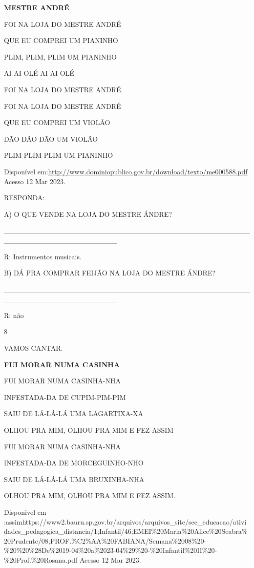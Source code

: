 {{\textbf{MESTRE ANDRÉ}

FOI NA LOJA DO MESTRE ANDRÉ

QUE EU COMPREI UM PIANINHO

PLIM, PLIM, PLIM UM PIANINHO

AI AI OLÉ AI AI OLÉ

FOI NA LOJA DO MESTRE ANDRÉ.

FOI NA LOJA DO MESTRE ANDRÉ

QUE EU COMPREI UM VIOLÃO

DÃO DÃO DÃO UM VIOLÃO

PLIM PLIM PLIM UM PIANINHO

Disponível
em:\url{http://www.dominiopublico.gov.br/download/texto/me000588.pdf}
Acesso 12 Mar 2023.

RESPONDA:

A) O QUE VENDE NA LOJA DO MESTRE ÁNDRE?

\_\_\_\_\_\_\_\_\_\_\_\_\_\_\_\_\_\_\_\_\_\_\_\_\_\_\_\_\_\_\_\_\_\_\_\_\_\_\_\_\_\_\_\_\_\_\_\_\_\_\_\_\_\_\_\_\_\_\_\_\_\_\_\_\_\_\_\_\_\_

R: Instrumentos musicais.

B) DÁ PRA COMPRAR FEIJÃO NA LOJA DO MESTRE ÁNDRE?

\_\_\_\_\_\_\_\_\_\_\_\_\_\_\_\_\_\_\_\_\_\_\_\_\_\_\_\_\_\_\_\_\_\_\_\_\_\_\_\_\_\_\_\_\_\_\_\_\_\_\_\_\_\_\_\_\_\_\_\_\_\_\_\_\_\_\_\_\_\_

R: não

\num{8}

VAMOS CANTAR.

\textbf{FUI MORAR NUMA CASINHA}

FUI MORAR NUMA CASINHA-NHA

INFESTADA-DA DE CUPIM-PIM-PIM

SAIU DE LÁ-LÁ-LÁ UMA LAGARTIXA-XA

OLHOU PRA MIM, OLHOU PRA MIM E FEZ ASSIM

FUI MORAR NUMA CASINHA-NHA

INFESTADA-DA DE MORCEGUINHO-NHO

SAIU DE LÁ-LÁ-LÁ UMA BRUXINHA-NHA

OLHOU PRA MIM, OLHOU PRA MIM E FEZ ASSIM.

Disponivel em
:assimhttps://www2.bauru.sp.gov.br/arquivos/arquivos\_site/sec\_educacao/atividades\_pedagogica\_distancia/1;Infantil/46;EMEI\%20Maria\%20Alice\%20Seabra\%20Prudente/08;PROF.\%C2\%AA\%20FABIANA/Semana\%2008\%20-\%20\%20\%28De\%2019-04\%20a\%2023-04\%29\%20-\%20Infantil\%20II\%20-\%20Prof.\%20Rosana.pdf
Acesso 12 Mar 2023.

}}
